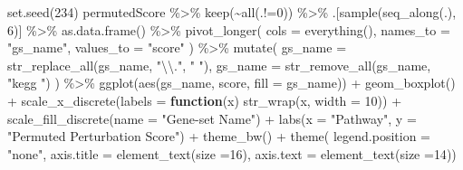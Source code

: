 \documentclass[9pt,a4paper,]{extarticle}
\newenvironment{Shaded}{\begin{snugshade}}{\end{snugshade}}
\newcommand{\AttributeTok}[1]{\textcolor[rgb]{0.77,0.63,0.00}{#1}}
\newcommand{\ControlFlowTok}[1]{\textcolor[rgb]{0.13,0.29,0.53}{\textbf{#1}}}
\newcommand{\DecValTok}[1]{\textcolor[rgb]{0.00,0.00,0.81}{#1}}
\newcommand{\FunctionTok}[1]{\textcolor[rgb]{0.00,0.00,0.00}{#1}}
\newcommand{\NormalTok}[1]{#1}
\newcommand{\SpecialCharTok}[1]{\textcolor[rgb]{0.00,0.00,0.00}{#1}}
\newcommand{\StringTok}[1]{\textcolor[rgb]{0.31,0.60,0.02}{#1}}
\begin{document}
\begin{Shaded}
\begin{Highlighting}[]
\FunctionTok{set.seed}\NormalTok{(}\DecValTok{234}\NormalTok{)}
\NormalTok{permutedScore }\SpecialCharTok{\%\textgreater{}\%}
    \FunctionTok{keep}\NormalTok{(}\SpecialCharTok{\textasciitilde{}}\FunctionTok{all}\NormalTok{(.}\SpecialCharTok{!=}\DecValTok{0}\NormalTok{)) }\SpecialCharTok{\%\textgreater{}\%}
\NormalTok{    .[}\FunctionTok{sample}\NormalTok{(}\FunctionTok{seq\_along}\NormalTok{(.), }\DecValTok{6}\NormalTok{)] }\SpecialCharTok{\%\textgreater{}\%}
    \FunctionTok{as.data.frame}\NormalTok{() }\SpecialCharTok{\%\textgreater{}\%}
    \FunctionTok{pivot\_longer}\NormalTok{(}
      \AttributeTok{cols =} \FunctionTok{everything}\NormalTok{(), }\AttributeTok{names\_to =} \StringTok{"gs\_name"}\NormalTok{, }\AttributeTok{values\_to =} \StringTok{"score"}
\NormalTok{    ) }\SpecialCharTok{\%\textgreater{}\%}
    \FunctionTok{mutate}\NormalTok{(}
        \AttributeTok{gs\_name =} \FunctionTok{str\_replace\_all}\NormalTok{(gs\_name, }\StringTok{"}\SpecialCharTok{\textbackslash{}\textbackslash{}}\StringTok{."}\NormalTok{, }\StringTok{" "}\NormalTok{),}
        \AttributeTok{gs\_name =} \FunctionTok{str\_remove\_all}\NormalTok{(gs\_name, }\StringTok{"kegg "}\NormalTok{)}
\NormalTok{    ) }\SpecialCharTok{\%\textgreater{}\%}
    \FunctionTok{ggplot}\NormalTok{(}\FunctionTok{aes}\NormalTok{(gs\_name, score, }\AttributeTok{fill =}\NormalTok{ gs\_name)) }\SpecialCharTok{+}
    \FunctionTok{geom\_boxplot}\NormalTok{() }\SpecialCharTok{+}
    \FunctionTok{scale\_x\_discrete}\NormalTok{(}\AttributeTok{labels =} \ControlFlowTok{function}\NormalTok{(x) }\FunctionTok{str\_wrap}\NormalTok{(x, }\AttributeTok{width =} \DecValTok{10}\NormalTok{)) }\SpecialCharTok{+}
    \FunctionTok{scale\_fill\_discrete}\NormalTok{(}\AttributeTok{name =} \StringTok{"Gene{-}set Name"}\NormalTok{) }\SpecialCharTok{+} 
    \FunctionTok{labs}\NormalTok{(}\AttributeTok{x =} \StringTok{"Pathway"}\NormalTok{, }\AttributeTok{y =} \StringTok{"Permuted Perturbation Score"}\NormalTok{) }\SpecialCharTok{+}
    \FunctionTok{theme\_bw}\NormalTok{() }\SpecialCharTok{+} 
    \FunctionTok{theme}\NormalTok{(}
        \AttributeTok{legend.position =} \StringTok{"none"}\NormalTok{, }
        \AttributeTok{axis.title =} \FunctionTok{element\_text}\NormalTok{(}\AttributeTok{size =}\DecValTok{16}\NormalTok{), }
        \AttributeTok{axis.text =} \FunctionTok{element\_text}\NormalTok{(}\AttributeTok{size =}\DecValTok{14}\NormalTok{))}
\end{Highlighting}
\end{Shaded}
\end{document}
